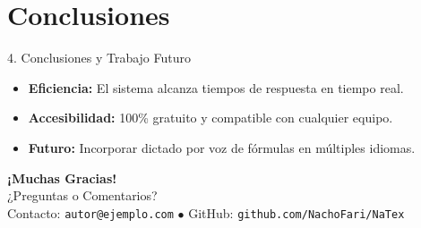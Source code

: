 \documentclass[aspectratio=169, 11pt]{beamer}
\begin{document}
\section{Conclusiones}
\begin{frame}{4. Conclusiones y Trabajo Futuro}
  \begin{itemize}
    \item \textbf{Eficiencia:} El sistema alcanza tiempos de respuesta en tiempo real.
    \item \textbf{Accesibilidad:} 100\% gratuito y compatible con cualquier equipo.
    \item \textbf{Futuro:} Incorporar dictado por voz de fórmulas en múltiples idiomas.
  \end{itemize}

  \vspace{0.8cm}
  \centering
  {\Huge \color{primary} \textbf{¡Muchas Gracias!}}\\[0.4cm]
  {\large ¿Preguntas o Comentarios?}\\[0.3cm]
  {\footnotesize Contacto: \texttt{autor@ejemplo.com} \quad $\bullet$ \quad GitHub: \texttt{github.com/NachoFari/NaTex}}
\end{frame}
\end{document}
